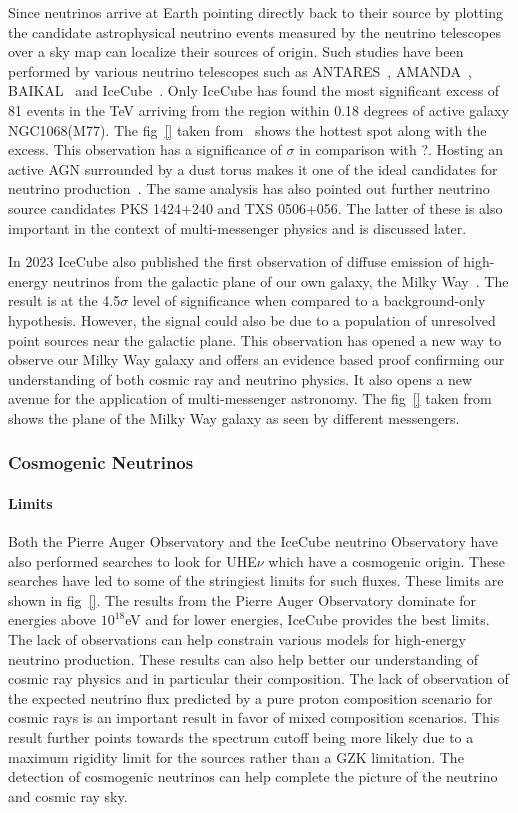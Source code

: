   Since neutrinos arrive at Earth pointing directly back to their source by plotting the candidate astrophysical neutrino events measured by the neutrino telescopes over a sky map can localize their sources of origin. Such studies have been performed by various neutrino telescopes such as ANTARES~\cite{}, AMANDA~\cite{}, BAIKAL~\cite{} and IceCube~\cite{}. Only IceCube has found the most significant excess of 81 events in the TeV arriving from the region within 0.18 degrees of active galaxy NGC1068(M77). The fig~\ref{} taken from~\cite{} shows the hottest spot along with the excess. This observation has a significance of $\sigma$ in comparison with ?. Hosting an active AGN surrounded by a dust torus makes it one of the ideal candidates for neutrino production~\cite{}. The same analysis has also pointed out further neutrino source candidates PKS 1424+240 and TXS 0506+056. The latter of these is also important in the context of multi-messenger physics and is discussed later. 

  In 2023 IceCube also published the first observation of diffuse emission of high-energy neutrinos from the galactic plane of our own galaxy, the Milky Way~\cite{}. The result is at the 4.5$\sigma$ level of significance when compared to a background-only hypothesis. However, the signal could also be due to a population of unresolved point sources near the galactic plane. This observation has opened a new way to observe our Milky Way galaxy and offers an evidence based proof confirming our understanding of both cosmic ray and neutrino physics. It also opens a new avenue for the application of multi-messenger astronomy. The fig~\ref{} taken from ~\cite{} shows the plane of the Milky Way galaxy as seen by different messengers.
  
\subsubsection*{Cosmogenic Neutrinos}

  \paragraph{Limits}
    \label{subsubsec:CosmoNuLimits}
  Both the Pierre Auger Observatory and the IceCube neutrino Observatory have also performed searches to look for UHE$\nu$ which have a cosmogenic origin. These searches have led to some of the stringiest limits for such fluxes. These limits are shown in fig~\ref{}. The results from the Pierre Auger Observatory dominate for energies above $10^{18}$eV and for lower energies, IceCube provides the best limits. The lack of observations can help constrain various models for high-energy neutrino production. These results can also help better our understanding of cosmic ray physics and in particular their composition. The lack of observation of the expected neutrino flux predicted by a pure proton composition scenario for cosmic rays is an important result in favor of mixed composition scenarios. This result further points towards the spectrum cutoff being more likely due to a maximum rigidity limit for the sources rather than a GZK limitation. The detection of cosmogenic neutrinos can help complete the picture of the neutrino and cosmic ray sky. 

